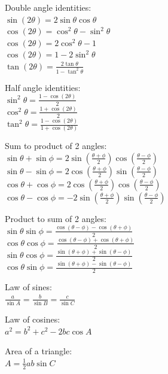 \documentclass[10pt,landscape,a4paper]{article}
\begin{document}
\begin{multicols*}{5}
  Double angle identities: \\
  \(\sin (2 \theta) = 2 \sin \theta \cos \theta\) \\
  \(\cos (2 \theta) = \cos^2 \theta - \sin^2 \theta\) \\
  \(\cos (2 \theta) = 2 \cos^2 \theta - 1\) \\
  \(\cos (2 \theta) = 1 - 2 \sin^2 \theta\) \\
  \(\tan (2 \theta) = \frac{2 \tan \theta}{1 - \tan^2 \theta}\)

  Half angle identities: \\
  \(\sin^2 \theta = \frac{1 - \cos (2 \theta)}{2}\) \\
  \(\cos^2 \theta = \frac{1 + \cos (2 \theta)}{2}\) \\
  \(\tan^2 \theta = \frac{1 - \cos (2 \theta)}{1 + \cos (2 \theta)}\)

  Sum to product of 2 angles: \\
  \(\sin \theta + \sin \phi = 2 \sin \left( \frac{\theta + \phi}{2} \right) \cos \left( \frac{\theta - \phi}{2} \right)\) \\
  \(\sin \theta - \sin \phi = 2 \cos \left( \frac{\theta + \phi}{2} \right) \sin \left( \frac{\theta - \phi}{2} \right)\) \\
  \(\cos \theta + \cos \phi = 2 \cos \left( \frac{\theta + \phi}{2} \right) \cos \left( \frac{\theta - \phi}{2} \right)\) \\
  \(\cos \theta - \cos \phi = - 2 \sin \left( \frac{\theta + \phi}{2} \right) \sin \left( \frac{\theta - \phi}{2} \right)\)

  Product to sum of 2 angles: \\
  \(\sin \theta \sin \phi = \frac{\cos (\theta - \phi) - \cos (\theta + \phi)}{2}\) \\
  \(\cos \theta \cos \phi = \frac{\cos (\theta - \phi) + \cos (\theta + \phi)}{2}\) \\
  \(\sin \theta \cos \phi = \frac{\sin (\theta + \phi) + \sin (\theta - \phi)}{2}\) \\
  \(\cos \theta \sin \phi = \frac{\sin (\theta + \phi) - \sin (\theta - \phi)}{2}\)

  Law of sines: \\
  \(\frac{a}{\sin A} = \frac{b}{\sin B} = \frac{c}{\sin C}\)

  Law of cosines: \\
  \(a^2 = b^2 + c^2 - 2bc \cos A\)

  Area of a triangle: \\
  \(A = \frac{1}{2} ab \sin C\)

\end{multicols*}
\end{document}

